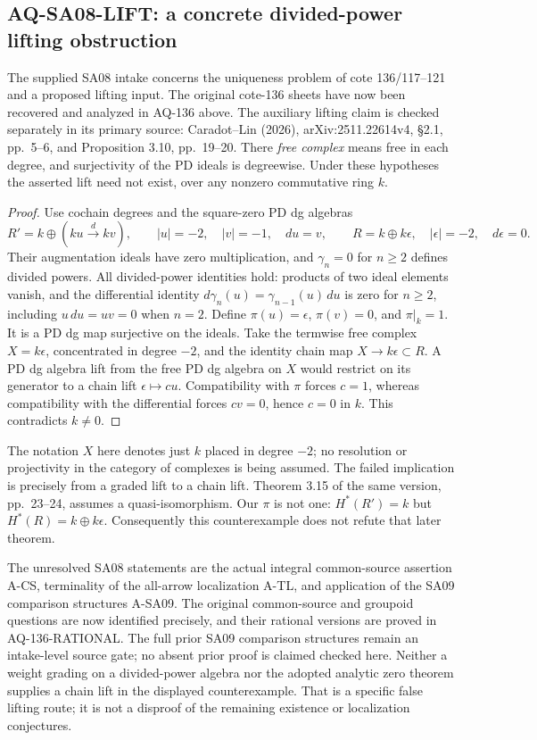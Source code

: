 \subsection{AQ-SA08-LIFT: a concrete divided-power lifting obstruction}
The supplied SA08 intake concerns the uniqueness problem
of cote 136/117--121 and a proposed lifting input.
The original cote-136 sheets have now been recovered and
analyzed in AQ-136 above.  The auxiliary lifting claim
is checked separately in its primary source: Caradot--Lin (2026),
arXiv:2511.22614v4, \S2.1, pp.~5--6, and
Proposition 3.10, pp.~19--20.
There \emph{free complex} means free in each degree,
and surjectivity of the PD ideals is degreewise.
Under these hypotheses the asserted lift need not exist,
over any nonzero commutative ring $k$.
\begin{proof}
Use cochain degrees and the square-zero PD dg algebras
\[
 R'=k\oplus(ku\xrightarrow{\,d\,}kv),\qquad
 |u|=-2,\quad |v|=-1,\quad du=v,
 \qquad R=k\oplus k\epsilon,\quad|\epsilon|=-2,\quad d\epsilon=0.
\]
Their augmentation ideals have zero multiplication,
and $\gamma_n=0$ for $n\geq2$ defines divided powers.
All divided-power identities hold: products of two
ideal elements vanish, and the differential identity
$d\gamma_n(u)=\gamma_{n-1}(u)\,du$ is zero for $n\geq2$,
including $u\,du=uv=0$ when $n=2$.
Define $\pi(u)=\epsilon$, $\pi(v)=0$, and $\pi|_k=1$.
It is a PD dg map surjective on the ideals.
Take the termwise free complex $X=k\epsilon$,
concentrated in degree $-2$, and the identity chain
map $X\to k\epsilon\subset R$.
A PD dg algebra lift from the free PD dg algebra
on $X$ would restrict on its generator to a chain
lift $\epsilon\mapsto cu$.
Compatibility with $\pi$ forces $c=1$, whereas
compatibility with the differential forces $cv=0$,
hence $c=0$ in $k$. This contradicts $k\ne0$.
\end{proof}
The notation $X$ here denotes just $k$ placed in
degree $-2$; no resolution or projectivity in the
category of complexes is being assumed.
The failed implication is precisely from a graded
lift to a chain lift. Theorem 3.15 of the same
version, pp.~23--24, assumes a quasi-isomorphism.
Our $\pi$ is not one:
$H^*(R')=k$ but $H^*(R)=k\oplus k\epsilon$.
Consequently this counterexample does not refute
that later theorem.

The unresolved SA08 statements are the actual
integral common-source assertion A-CS, terminality
of the all-arrow localization A-TL, and application
of the SA09 comparison structures A-SA09.
The original common-source and groupoid questions are now
identified precisely, and their rational versions are proved
in AQ-136-RATIONAL.  The full prior SA09 comparison
structures remain an intake-level source gate; no absent
prior proof is claimed checked here.
Neither a weight grading on a divided-power algebra
nor the adopted analytic zero theorem supplies a
chain lift in the displayed counterexample.
That is a specific false lifting route; it is not
a disproof of the remaining existence or
localization conjectures.


